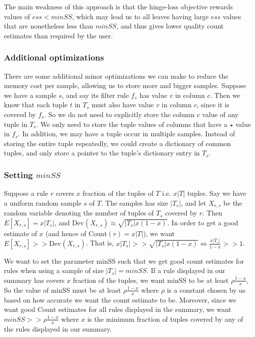 \documentclass[10pt,journal,compsoc]{IEEEtran}
\begin{document}
{The main weakness of this approach is that the hinge-loss objective rewards values of $ess < minSS$, which may lead us to all leaves having large $ess$ values that are nonetheless less than $minSS$, and thus gives lower quality count estimates than required by the user.


\subsubsection{Additional optimizations}
There are some additional minor optimizations we can make to reduce the memory cost per sample, allowing us to store more and bigger samples. 
Suppose we have a sample $s$, and say its filter rule $f_s$ has value $v$ in column $c$. Then we know that each tuple $t$ in $T_s$ must also have value $v$ in column $c$, since it is covered by $f_s$. So we do not need to explicitly store the column $c$ value of any tuple in $T_s$. We only need to store the tuple values of columns that have a $\star$ value in $f_s$.
In addition, we may have a tuple occur in multiple samples. Instead of storing the entire tuple repeatedly, we could create a dictionary of common tuples, and only store a pointer to the tuple's dictionary entry in $T_s$. 


\subsubsection{Setting $minSS$}
Suppose a rule $r$ covers $x$ fraction of the tuples of $T$ i.e. $x|T|$ tuples. Say we have a uniform random sample $s$ of $T$. The samples has size $|T_s|$, and let $X_{r,s}$ be the random variable denoting the number of tuples of $T_s$ covered by $r$. Then $E\left[ X_{r,s} \right] = x|T_s|$, and $\text{Dev}(X_{r,s}) \approx \sqrt{|T_s|x(1-x)}$. In order to get a good estimate of $x$ (and hence of Count$(r) = x|T|$), we want $E\left[X_{r,s}\right] >> \text{Dev}(X_{r,s})$. That is, $x|T_s| >> \sqrt{|T_s|x(1-x)} \Leftrightarrow \frac{x|T_s|}{1-x} >> 1$. 

We want to set the parameter minSS such that we get good count estimates for rules when using a sample of size $|T_s| = minSS$. If a rule displayed in our summary has covers $x$ fraction of the tuples, we want minSS to be at least $\rho\frac{1-x}{x}$, So the value of minSS must be at least $\rho\frac{1-x}{x}$ where $\rho$ is a constant chosen by us based on how accurate we want the count estimate to be. Moreover, since we want good Count estimates for all rules displayed in the summary, we want $minSS >> \rho\frac{1-x}{x}$ where $x$ is the minimum fraction of tuples covered by any of the rules displayed in our summary.

}
\end{document}
